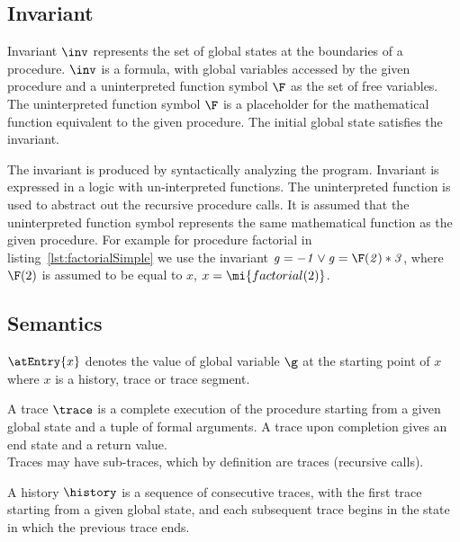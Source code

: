 \subsection{Invariant}\label{sec:invariant}

\begin{definition}[invariant]
  Invariant $\inv$ represents the set of
  global states at the boundaries of a procedure. $\inv$ is a formula,
  with global variables accessed by the given procedure and a
  uninterpreted function symbol $\F$ as the set of free variables. The
  uninterpreted function symbol $\F$ is a placeholder for the
  mathematical function equivalent to the given procedure. The initial
  global state satisfies the invariant.
\end{definition}

The invariant is produced by syntactically analyzing the
program. Invariant is expressed in a logic with un-interpreted
functions. The uninterpreted function is used to abstract out the
recursive procedure calls. It is assumed that the uninterpreted
function symbol represents the same mathematical function as the given
procedure. For example for procedure factorial in
listing~\ref{lst:factorialSimple} we use the invariant $\mathit{g = -1
  \vee g = \F(2) * 3}$, where $\F(2)$ is assumed to be equal to $x$,
$x = \mi{factorial(2)}$.

\subsection{Semantics}

\begin{definition} 
  $\\\atEntry{x}$ denotes the value of global variable $\g$ at the
  starting point of $x$ where $x$ is a history, trace or trace
  segment.
\end{definition}

\begin{definition}[trace]
  A trace $\trace$ is a complete execution of the procedure starting
  from a given global state and a tuple of formal arguments. A trace
  upon completion gives an end state and a return value.\\ Traces may
  have sub-traces, which by definition are traces (recursive calls).
\end{definition}

\begin{definition}[history]
  A history $\history$ is a sequence of consecutive traces, with the
  first trace starting from a given global state, and each subsequent
  trace begins in the state in which the previous trace ends.
\end{definition}


